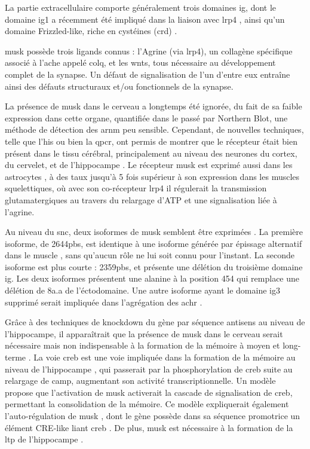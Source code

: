 La partie extracellulaire comporte généralement trois domaines \gls{ig}, dont le domaine \gls{ig}1 a récemment été impliqué dans la liaison avec \gls{lrp}4 \cite{Zhang2011}, ainsi qu'un domaine Frizzled-like, riche en cystéines (\gls{crd}) \cite{Jing2009}.

\gls{musk} possède trois ligands connus : l'Agrine (via \acrshort{lrp}4), un collagène spécifique associé à l'\Gls{ache} appelé \acrshort{colq}, et les \Glspl{wnt}, tous nécessaire au développement complet de la synapse. Un défaut de signalisation de l'un d'entre eux entraîne ainsi des défauts structuraux et/ou fonctionnels de la synapse.

La présence de \gls{musk} dans le cerveau a longtemps été ignorée, du fait de sa faible expression dans cette organe, quantifiée dans le passé par Northern Blot, une méthode de détection des \acrshort{arnm} peu sensible. Cependant, de nouvelles techniques, telle que l'\gls{his} ou bien la \gls{qpcr}, ont permis de montrer que le récepteur était bien présent dans le tissu cérébral, principalement au niveau des neurones du cortex, du cervelet, et de l'hippocampe \cite{Garcia-Osta2006, Ksiazek2007}. Le récepteur \gls{musk} est exprimé aussi dans les astrocytes \cite{Sun2016}, à des taux jusqu'à 5 fois supérieur à son expression dans les muscles squelettiques, où avec son co-récepteur \gls{lrp}4 il régulerait la transmission glutamatergiques au travers du relargage d'ATP et une signalisation liée à l'agrine.

Au niveau du \gls{snc}, deux isoformes de \gls{musk} semblent être exprimées \cite{Garcia-Osta2006}. La première isoforme, de 2644pbs, est identique à une isoforme générée par épissage alternatif dans le muscle \cite{Valenzuela1995}, sans qu'aucun rôle ne lui soit connu pour l'instant. La seconde isoforme est plus courte : 2359pbs, et présente une délétion du troisième domaine \gls{ig}. Les deux isoformes présentent une alanine à la position 454 qui remplace une délétion de 8a.a de l'éctodomaine. Une autre isoforme ayant le domaine \gls{ig}3 supprimé serait impliquée dans l'agrégation des \gls{achr} \cite{Hesser1999}.

Grâce à des techniques de knockdown du gène par séquence antisens au niveau de l'hippocampe, il apparaîtrait que la présence de \gls{musk} dans le cerveau serait nécessaire mais non indispensable à la formation de la mémoire à moyen et long-terme \cite{Garcia-Osta2006}. La voie \gls{creb} est une voie impliquée dans la formation de la mémoire au niveau de l'hippocampe \cite{Silva1998, Kandel2012,Kida2014,Ortega-Martinez2015}, qui passerait par la phosphorylation de \gls{creb} suite au relargage de \acrshort{camp}, augmentant son activité transcriptionnelle. Un modèle propose \cite{Garcia-Osta2006} que l'activation de \gls{musk} activerait la cascade de signalisation de \gls{creb}, permettant la consolidation de la mémoire. Ce modèle expliquerait également l'auto-régulation de \gls{musk} \cite{Moore2001}, dont le gène possède dans sa séquence promotrice un élément CRE-like liant \gls{creb} \cite{Kim2005}. De plus, \gls{musk} est nécessaire à la formation de la \gls{ltp} de l'hippocampe \cite{Garcia-Osta2006}.

